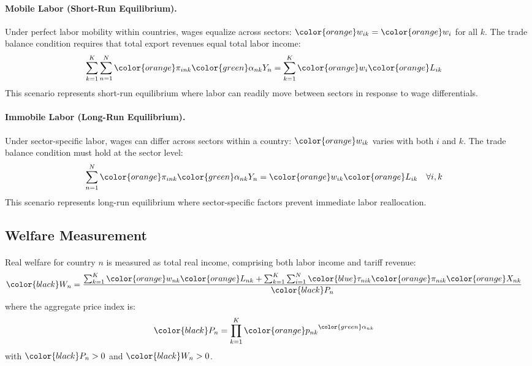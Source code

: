\paragraph{\textbf{Mobile Labor (Short-Run Equilibrium).}} Under perfect labor mobility within countries, wages equalize across sectors: ${\color{orange}w_{ik}} = {\color{orange}w_{i}}$ for all $k$. The trade balance condition requires that total export revenues equal total labor income:
\begin{align*}
   \sum_{k=1}^{K} \sum_{n=1}^{N} {\color{orange}\pi_{ink}} {\color{green}\alpha_{nk}} Y_n  &= \sum_{k=1}^{K} {\color{orange}w_{i}} {\color{orange}L_{ik}}
\end{align*}
This scenario represents short-run equilibrium where labor can readily move between sectors in response to wage differentials.

\paragraph{\textbf{Immobile Labor (Long-Run Equilibrium).}} Under sector-specific labor, wages can differ across sectors within a country: ${\color{orange}w_{ik}}$ varies with both $i$ and $k$. The trade balance condition must hold at the sector level:
\begin{align*}
   \sum_{n=1}^{N} {\color{orange}\pi_{ink}} {\color{green}\alpha_{nk}} Y_n  &= {\color{orange}w_{ik}} {\color{orange}L_{ik}} \quad \forall i,k
\end{align*}
This scenario represents long-run equilibrium where sector-specific factors prevent immediate labor reallocation.

\subsection{Welfare Measurement}

\paragraph{} Real welfare for country $n$ is measured as total real income, comprising both labor income and tariff revenue:
\begin{align*}
    {\color{black}W_n} &= \frac{\sum_{k=1}^{K} {\color{orange}w_{nk}} {\color{orange}L_{nk}} + \sum_{k=1}^{K} \sum_{i=1}^{N} {\color{blue}\tau_{nik}} {\color{orange}\pi_{nik}} {\color{orange}X_{nk}}}{{\color{black}P_n}}
\end{align*}
where the aggregate price index is:
\begin{align*}
    {\color{black}P_n} &= \prod_{k=1}^{K} {\color{orange}p_{nk}}^{{\color{green}\alpha_{nk}}}
\end{align*}
with ${\color{black}P_n} > 0$ and ${\color{black}W_n} > 0$.

